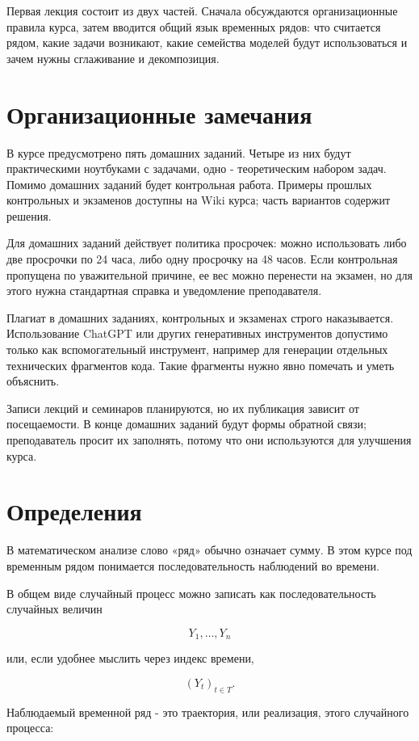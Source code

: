 \documentclass[12pt,fleqn]{article}
\begin{document}
Первая лекция состоит из двух частей.
Сначала обсуждаются организационные правила курса, затем вводится общий язык временных рядов: что считается рядом, какие задачи возникают, какие семейства моделей будут использоваться и зачем нужны сглаживание и декомпозиция.


\section{Организационные замечания}


В курсе предусмотрено пять домашних заданий.
Четыре из них будут практическими ноутбуками с задачами, одно - теоретическим набором задач.
Помимо домашних заданий будет контрольная работа.
Примеры прошлых контрольных и экзаменов доступны на Wiki курса; часть вариантов содержит решения.

Для домашних заданий действует политика просрочек: можно использовать либо две просрочки по 24 часа, либо одну просрочку на 48 часов.
Если контрольная пропущена по уважительной причине, ее вес можно перенести на экзамен, но для этого нужна стандартная справка и уведомление преподавателя.

Плагиат в домашних заданиях, контрольных и экзаменах строго наказывается.
Использование ChatGPT или других генеративных инструментов допустимо только как вспомогательный инструмент, например для генерации отдельных технических фрагментов кода.
Такие фрагменты нужно явно помечать и уметь объяснить.

Записи лекций и семинаров планируются, но их публикация зависит от посещаемости.
В конце домашних заданий будут формы обратной связи; преподаватель просит их заполнять, потому что они используются для улучшения курса.


\section{Определения}


В математическом анализе слово «ряд» обычно означает сумму.
В этом курсе под временным рядом понимается последовательность наблюдений во времени.

В общем виде случайный процесс можно записать как последовательность случайных величин

\[
Y_1,\ldots,Y_n
\]

или, если удобнее мыслить через индекс времени,

\[
(Y_t)_{t\in T}.
\]

Наблюдаемый временной ряд - это траектория, или реализация, этого случайного процесса:
\end{document}

